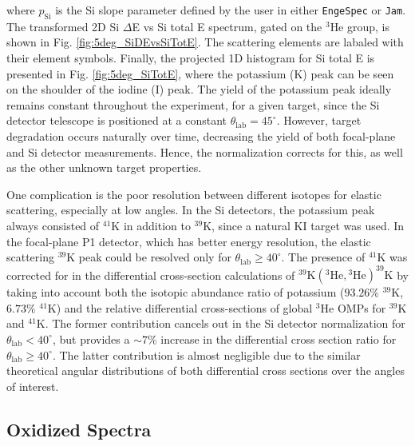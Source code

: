 \noindent
where $p_{\mathrm{Si}}$ is the Si slope parameter defined by the user in either \texttt{EngeSpec} or \texttt{Jam}. The transformed 2D Si $\Delta$E vs Si total E spectrum, gated on the $^{3}$He group, is shown in Fig. \ref{fig:5deg_SiDEvsSiTotE}. The scattering elements are labaled with their element symbols. Finally, the projected 1D histogram for Si total E is presented in Fig. \ref{fig:5deg_SiTotE}, where the potassium (K) peak can be seen on the shoulder of the iodine (I) peak. The yield of the potassium peak ideally remains constant throughout the experiment, for a given target, since the Si detector telescope is positioned at a constant $\theta_{\mathrm{lab}} = 45^{\circ}$. However, target degradation occurs naturally over time, decreasing the yield of both focal-plane and Si detector measurements. Hence, the normalization corrects for this, as well as the other unknown target properties. 

One complication is the poor resolution between different isotopes for elastic scattering, especially at low angles. In the Si detectors, the potassium peak always consisted of $^{41}$K in addition to $^{39}$K, since a natural KI target was used. In the focal-plane P1 detector, which has better energy resolution, the elastic scattering $^{39}$K peak could be resolved only for $\theta_{\mathrm{lab}} \geq 40^{\circ}$. The presence of $^{41}$K was corrected for in the differential cross-section calculations of $^{39}\mathrm{K}(^{3}\mathrm{He}, {}^{3}\mathrm{He})^{39}\mathrm{K}$ by taking into account both the isotopic abundance ratio of potassium ($93.26\%$ $^{39}$K, $6.73\%$ $^{41}$K) and the relative differential cross-sections of global $^{3}$He OMPs for $^{39}$K and $^{41}$K. The former contribution cancels out in the Si detector normalization for $\theta_{\mathrm{lab}} < 40^{\circ}$, but provides a $\sim 7\%$ increase in the differential cross section ratio for $\theta_{\mathrm{lab}} \geq 40^{\circ}$. The latter contribution is almost negligible due to the similar theoretical angular distributions of both differential cross sections over the angles of interest.


\subsection{Oxidized Spectra} \label{subsec:oxidized_spectra}


